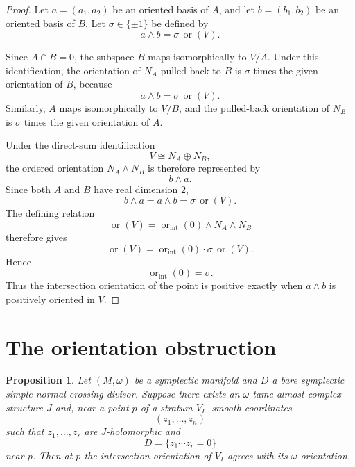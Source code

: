 \documentclass[12pt]{article}
\newtheorem{proposition}[theorem]{Proposition}
\begin{document}
\begin{proof}
Let \(a=(a_1,a_2)\) be an oriented basis of \(A\), and let \(b=(b_1,b_2)\) be an oriented basis of \(B\). Let \(\sigma\in\{\pm1\}\) be defined by
\[
a\wedge b=\sigma\,\operatorname{or}(V).
\]

Since \(A\cap B=0\), the subspace \(B\) maps isomorphically to \(V/A\). Under this identification, the orientation of \(N_A\) pulled back to \(B\) is \(\sigma\) times the given orientation of \(B\), because
\[
a\wedge b=\sigma\,\operatorname{or}(V).
\]
Similarly, \(A\) maps isomorphically to \(V/B\), and the pulled-back orientation of \(N_B\) is \(\sigma\) times the given orientation of \(A\).

Under the direct-sum identification
\[
V\cong N_A\oplus N_B,
\]
the ordered orientation \(N_A\wedge N_B\) is therefore represented by
\[
b\wedge a.
\]
Since both \(A\) and \(B\) have real dimension \(2\),
\[
b\wedge a=a\wedge b=\sigma\,\operatorname{or}(V).
\]
The defining relation
\[
\operatorname{or}(V)
=
\operatorname{or}_{\mathrm{int}}(0)\wedge N_A\wedge N_B
\]
therefore gives
\[
\operatorname{or}(V)
=
\operatorname{or}_{\mathrm{int}}(0)\cdot \sigma\,\operatorname{or}(V).
\]
Hence
\[
\operatorname{or}_{\mathrm{int}}(0)=\sigma.
\]
Thus the intersection orientation of the point is positive exactly when \(a\wedge b\) is positively oriented in \(V\).
\end{proof}

\section{The orientation obstruction}

\begin{proposition}\label{prop:necessity}
Let \((M,\omega)\) be a symplectic manifold and \(D\) a bare symplectic simple normal crossing divisor. Suppose there exists an \(\omega\)-tame almost complex structure \(J\) and, near a point \(p\) of a stratum \(V_I\), smooth coordinates
\[
(z_1,\dots,z_n)
\]
such that \(z_1,\dots,z_r\) are \(J\)-holomorphic and
\[
D=\{z_1\cdots z_r=0\}
\]
near \(p\). Then at \(p\) the intersection orientation of \(V_I\) agrees with its \(\omega\)-orientation.
\end{proposition}
\end{document}
